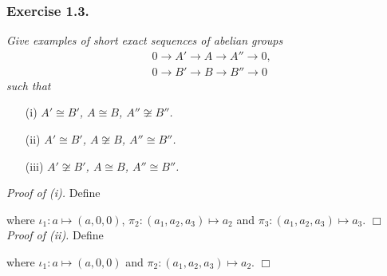\documentclass{article}
\begin{document}
\subsubsection*{Exercise 1.3.}
\emph{Give examples of short exact sequences of abelian groups
\begin{align*}
  & 0 \to A' \to A \to A'' \to 0, \\
  & 0 \to B' \to B \to B'' \to 0
\end{align*}
such that}
\begin{enumerate}
\item[(i)]
  \emph{$A' \cong B'$, $A \cong B$, $A'' \not\cong B''$.}

\item[(ii)]
  \emph{$A' \cong B'$, $A \not\cong B$, $A'' \cong B''$.}

\item[(iii)]
  \emph{$A' \not\cong B'$, $A \cong B$, $A'' \cong B''$.} \\
\end{enumerate}



\emph{Proof of (i).}
  Define
  \begin{center}
  \end{center}
  where $\iota_1: a \mapsto (a, 0, 0)$,
  $\pi_2: (a_1, a_2, a_3) \mapsto a_2$ and $\pi_3: (a_1, a_2, a_3) \mapsto a_3$.
$\Box$ \\



\emph{Proof of (ii).}
  Define
  \begin{center}
  \end{center}
  where $\iota_1: a \mapsto (a, 0, 0)$ and $\pi_2: (a_1, a_2, a_3) \mapsto a_2$.
$\Box$ \\
\end{document}
